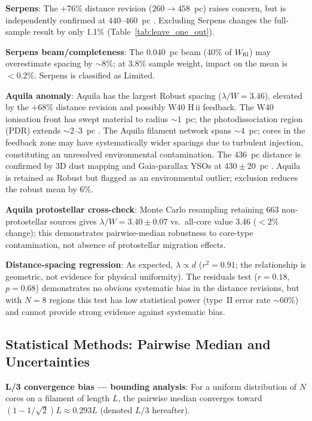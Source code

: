 \documentclass[twoside,twocolumn]{mnras}
\begin{document}
\textbf{Serpens}: The +76\% distance revision ($260 \to 458$~pc) raises concern, but is independently confirmed at $440$--$460$~pc \citep{Yan2022, Green2024, Zucker2020}. Excluding Serpens changes the full-sample result by only 1.1\% (Table~\ref{tab:leave_one_out}).

\textbf{Serpens beam/completeness}: The $0.040$~pc beam (40\% of $W_{\rm fil}$) may
overestimate spacing by ${\sim}8\%$; at 3.8\% sample weight, impact on the mean is
$<0.2\%$. Serpens is classified as Limited.

\textbf{Aquila anomaly}: Aquila has the largest Robust spacing ($\lambda/W = 3.46$),
elevated by the $+68\%$ distance revision and possibly W40 H\,{\sc ii} feedback.
The W40 ionisation front has swept material to radius ${\sim}1$~pc; the
photodissociation region (PDR) extends ${\sim}2$--$3$~pc \citep{Bontemps2010,
Strafella2015}. The Aquila filament network spans ${\sim}4$~pc; cores in the feedback
zone may have systematically wider spacings due to turbulent injection, constituting an
unresolved environmental contamination. The 436~pc distance is confirmed by 3D dust
mapping \citep{Zucker2020} and Gaia-parallax YSOs at $430 \pm 20$~pc
\citep{Konyves2020}. Aquila is retained as Robust but flagged as an environmental outlier;
exclusion reduces the robust mean by 6\%.

\textbf{Aquila protostellar cross-check}: Monte Carlo resampling retaining 663 non-protostellar sources gives $\lambda/W = 3.40 \pm 0.07$ vs.\ all-core value 3.46 ($<2\%$ change); this demonstrates pairwise-median robustness to core-type contamination, not absence of protostellar migration effects.

\textbf{Distance-spacing regression}: As expected, $\lambda \propto d$ ($r^2 = 0.91$;
the relationship is geometric, not evidence for physical uniformity). The residuals
test ($r = 0.18$, $p = 0.68$) demonstrates no obvious systematic bias in the
distance revisions, but with $N = 8$ regions this test has low statistical power
(type~II error rate ${\sim}60\%$) and cannot provide strong evidence against
systematic bias.

\subsection{Statistical Methods: Pairwise Median and Uncertainties}
\label{sec:statistics}

\textbf{L/3 convergence bias --- bounding analysis}: For a uniform distribution of
$N$ cores on a filament of length $L$, the pairwise median converges toward
$(1-1/\sqrt{2})L \approx 0.293L$ (denoted $L/3$ hereafter).
\end{document}
